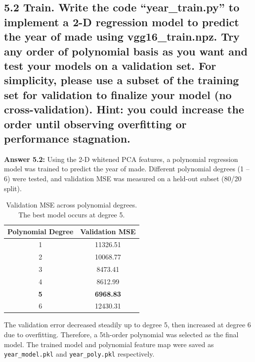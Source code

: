 \documentclass[12pt]{article}
\begin{document}
\subsection*{5.2
Train. Write the code “year\_train.py” to implement a 2-D regression model to predict the year of made using vgg16\_train.npz. Try any order of polynomial basis as you want and test your models on a validation set. For simplicity, please use a subset of the training set for validation to finalize your model (no cross-validation). Hint: you could increase the order until observing overfitting or performance stagnation.}
\textbf{Answer 5.2:}
Using the 2-D whitened PCA features, a polynomial regression model was trained to predict the
year of made. Different polynomial degrees (1 – 6) were tested, and validation MSE was measured
on a held-out subset (80/20 split).

\begin{table}[h!]
\centering
\begin{tabular}{c|c}
\textbf{Polynomial Degree} & \textbf{Validation MSE} \\
\hline
1 & 11326.51 \\
2 & 10068.77 \\
3 & 8473.41 \\
4 & 8612.99 \\
\textbf{5} & \textbf{6968.83} \\
6 & 12430.31 \\
\end{tabular}
\caption{Validation MSE across polynomial degrees. The best model occurs at degree 5.}
\label{tab:p5_train}
\end{table}

The validation error decreased steadily up to degree 5, then increased at degree 6 due to
overfitting. Therefore, a 5th-order polynomial was selected as the final model.  
The trained model and polynomial feature map were saved as
\texttt{year\_model.pkl} and \texttt{year\_poly.pkl} respectively.
\end{document}
